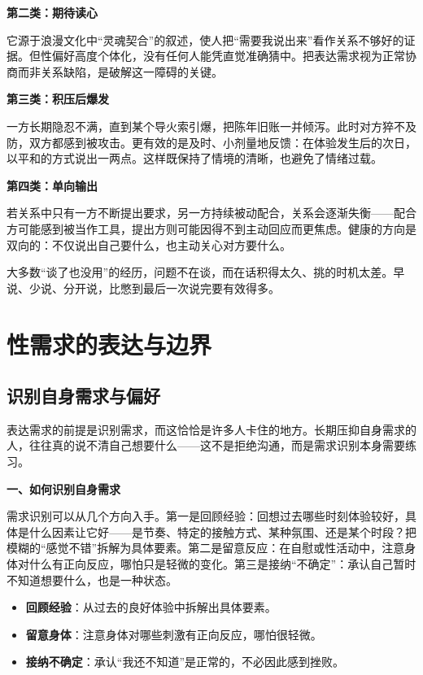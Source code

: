 \documentclass[12pt,UTF8]{ctexbook}
\begin{document}
\textbf{第二类：期待读心}

它源于浪漫文化中“灵魂契合”的叙述，使人把“需要我说出来”看作关系不够好的证据。但性偏好高度个体化，没有任何人能凭直觉准确猜中。把表达需求视为正常协商而非关系缺陷，是破解这一障碍的关键。

\textbf{第三类：积压后爆发}

一方长期隐忍不满，直到某个导火索引爆，把陈年旧账一并倾泻。此时对方猝不及防，双方都感到被攻击。更有效的是及时、小剂量地反馈：在体验发生后的次日，以平和的方式说出一两点。这样既保持了情境的清晰，也避免了情绪过载。

\textbf{第四类：单向输出}

若关系中只有一方不断提出要求，另一方持续被动配合，关系会逐渐失衡——配合方可能感到被当作工具，提出方则可能因得不到主动回应而更焦虑。健康的方向是双向的：不仅说出自己要什么，也主动关心对方要什么。

\begin{tcolorbox}[colback=pink!5!white,colframe=red!50!black,title=贴心小叮咛]
大多数“谈了也没用”的经历，问题不在谈，而在话积得太久、挑的时机太差。早说、少说、分开说，比憋到最后一次说完要有效得多。
\end{tcolorbox}

\section{性需求的表达与边界}

\subsection{识别自身需求与偏好}

表达需求的前提是识别需求，而这恰恰是许多人卡住的地方。长期压抑自身需求的人，往往真的说不清自己想要什么——这不是拒绝沟通，而是需求识别本身需要练习。

\textbf{一、如何识别自身需求}

需求识别可以从几个方向入手。第一是回顾经验：回想过去哪些时刻体验较好，具体是什么因素让它好——是节奏、特定的接触方式、某种氛围、还是某个时段？把模糊的“感觉不错”拆解为具体要素。第二是留意反应：在自慰或性活动中，注意身体对什么有正向反应，哪怕只是轻微的变化。第三是接纳“不确定”：承认自己暂时不知道想要什么，也是一种状态。

\begin{itemize}
\item \textbf{回顾经验}：从过去的良好体验中拆解出具体要素。
\item \textbf{留意身体}：注意身体对哪些刺激有正向反应，哪怕很轻微。
\item \textbf{接纳不确定}：承认“我还不知道”是正常的，不必因此感到挫败。
\end{itemize}
\end{document}
